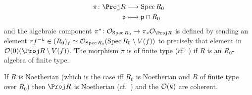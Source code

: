 \documentclass[a4paper,parskip=half,numbers=enddot, DIV=12]{scrreprt}
\begin{document}
\begin{prop}
\begin{alphanumerate}
		\begin{align}\lbl{eq:Proj(R)toSpecR0}
			\begin{split}
				\pi\colon\Proj R&\morphism \Spec R_0\\
				\pp &\longmapsto \pp\cap R_0
			\end{split}
		\end{align}
		and the algebraic component $\pi^*\colon \Oo_{\Spec R_0}\morphism \pi_*\Oo_{\Proj R}$ is defined by sending an element $rf^{-k}\in (R_0)_f\simeq \mathcal{O}_{\operatorname{Spec} R_0}(\operatorname{Spec} R_0\setminus V(f))$ to precisely that element in $\Oo(0)(\Proj R\setminus V(f))$. The morphism $\pi$ is of finite type (cf.\ \cite[Definition~2.2.1]{alggeo1}) if $R$ is an $R_0$-algebra of finite type.
		\item If $R$ is Noetherian (which is the case iff $R_0$ is Noetherian and $R$ of finite type over $R_0$) then $\Proj R$ is Noetherian (cf.\ \cite[Definition~2.2.2]{alggeo1}) and the $\mathcal{O}(k)$ are coherent.
	\end{alphanumerate}
\end{prop}
\end{document}
